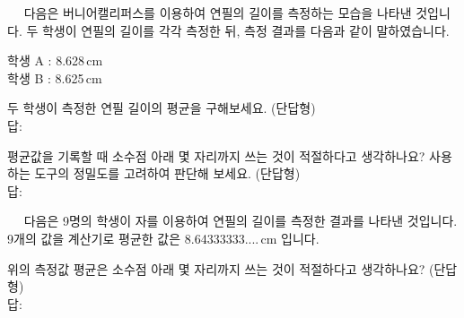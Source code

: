\begin{graybox}
~~ 다음은 버니어캘리퍼스를 이용하여 연필의 길이를 측정하는 모습을 나타낸 것입니다.
두 학생이 연필의 길이를 각각 측정한 뒤, 측정 결과를 다음과 같이 말하였습니다.
\begin{center}학생 A : 8.628\,cm \\ 학생 B : 8.625\,cm\end{center}\vspace*{6pt}
\caliperpencilnotg
\end{graybox}\vspace{0.4em}

\begin{graybox}\vspace*{0.2em}\bn
두 학생이 측정한 연필 길이의 평균을 구해보세요.
(단답형) \\ 답: 
\vspace*{0.4em}\end{graybox}\vspace{0.4em}

\begin{graybox}\vspace*{0.2em}\bn
평균값을 기록할 때 소수점 아래 몇 자리까지 쓰는 것이 적절하다고 생각하나요?
사용하는 도구의 정밀도를 고려하여 판단해 보세요.
(단답형) \\ 답: 
\vspace*{0.4em}\end{graybox}\vspace{0.4em}


\clearpage


\bnset
\begin{graybox}\centering
{\fontsize{14pt}{17pt}\selectfont\bd{\an
\ItemTitleiv
}}\vspace*{0.8em}\end{graybox}\vspace{0.4em}

\begin{graybox}
~~ 다음은 9명의 학생이 자를 이용하여 연필의 길이를 측정한 결과를 나타낸 것입니다.
9개의 값을 계산기로 평균한 값은 8.64333333....\,cm 입니다.
\SeveralMeasurementValues
\end{graybox}\vspace{0.4em}

\begin{graybox}\vspace*{0.2em}\bn
위의 측정값 평균은 소수점 아래 몇 자리까지 쓰는 것이 적절하다고 생각하나요?
(단답형) \\ 답: 
\vspace*{0.4em}\end{graybox}\vspace{0.4em}

